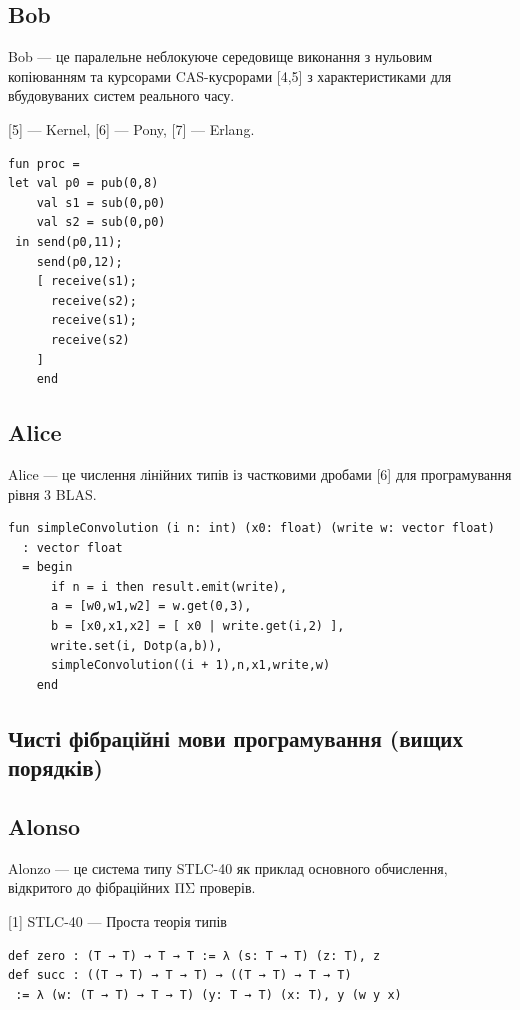 \newpage
\subsection*{Bob}

Bob — це паралельне неблокуюче середовище виконання з нульовим копіюванням
та курсорами CAS-кусрорами [4,5] з характеристиками для вбудовуваних систем
реального часу.

[5] — Kernel, [6] — Pony, [7] — Erlang.

\begin{lstlisting}
fun proc =
let val p0 = pub(0,8)
    val s1 = sub(0,p0)
    val s2 = sub(0,p0)
 in send(p0,11);
    send(p0,12);
    [ receive(s1);
      receive(s2);
      receive(s1);
      receive(s2)
    ]
    end
\end{lstlisting}

\subsection*{Alice}

Alice — це числення лінійних типів із частковими дробами [6] для програмування рівня 3 BLAS.

\begin{lstlisting}
fun simpleConvolution (i n: int) (x0: float) (write w: vector float)
  : vector float
  = begin
      if n = i then result.emit(write),
      a = [w0,w1,w2] = w.get(0,3),
      b = [x0,x1,x2] = [ x0 | write.get(i,2) ],
      write.set(i, Dotp(a,b)),
      simpleConvolution((i + 1),n,x1,write,w)
    end
\end{lstlisting}

\newpage
\subsection*{Чисті фібраційні мови програмування (вищих порядків)}

\subsection*{Alonso}

Alonzo — це система типу STLC-40 як приклад основного обчислення,
відкритого до фібраційних ΠΣ проверів.

[1] STLC-40 — Проста теорія типів

\begin{lstlisting}
def zero : (T → T) → T → T := λ (s: T → T) (z: T), z
def succ : ((T → T) → T → T) → ((T → T) → T → T)
 := λ (w: (T → T) → T → T) (y: T → T) (x: T), y (w y x)
\end{lstlisting}

